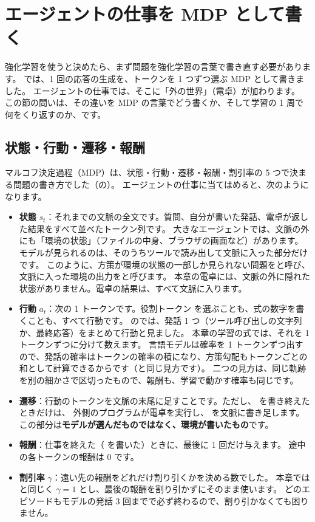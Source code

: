 \section{エージェントの仕事を MDP として書く}\label{sec:arl-mdp}

強化学習を使うと決めたら、まず問題を強化学習の言葉で書き直す必要があります。
では、1 回の応答の生成を、トークンを 1 つずつ選ぶ MDP として書きました。
エージェントの仕事では、そこに「外の世界」（電卓）が加わります。
この節の問いは、その違いを MDP の言葉でどう書くか、そして学習の 1 周で何をくり返すのか、です。

\subsection{状態・行動・遷移・報酬}

マルコフ決定過程（MDP）は、状態・行動・遷移・報酬・割引率の 5 つで決まる問題の書き方でした（の）。
エージェントの仕事に当てはめると、次のようになります。

\begin{itemize}
\item \textbf{状態} $s_t$：それまでの文脈の全文です。質問、自分が書いた発話、電卓が返した結果をすべて並べたトークン列です。
大きなエージェントでは、文脈の外にも「環境の状態」（ファイルの中身、ブラウザの画面など）があります。
モデルが見られるのは、そのうちツールで読み出して文脈に入った部分だけです。
このように、方策が環境の状態の一部しか見られない問題をと呼び、文脈に入った環境の出力をと呼びます。
本章の電卓には、文脈の外に隠れた状態がありません。電卓の結果は、すべて文脈に入ります。
\item \textbf{行動} $a_t$：次の 1 トークンです。役割トークン  を選ぶことも、式の数字を書くことも、すべて行動です。
のでは、発話 1 つ（ツール呼び出しの文字列か、最終応答）をまとめて行動と見ました。
本章の学習の式では、それを 1 トークンずつに分けて数えます。
言語モデルは確率を 1 トークンずつ出すので、発話の確率はトークンの確率の積になり、方策勾配もトークンごとの和として計算できるからです（と同じ見方です）。
二つの見方は、同じ軌跡を別の細かさで区切ったもので、報酬も、学習で動かす確率も同じです。
\item \textbf{遷移}：行動のトークンを文脈の末尾に足すことです。ただし、 を書き終えたときだけは、
外側のプログラムが電卓を実行し、 を文脈に書き足します。
この部分は\textbf{モデルが選んだものではなく、環境が書いたもの}です。
\item \textbf{報酬}：仕事を終えた（ を書いた）ときに、最後に 1 回だけ与えます。
途中の各トークンの報酬は 0 です。
\item \textbf{割引率} $\gamma$：遠い先の報酬をどれだけ割り引くかを決める数でした。
本章ではと同じく $\gamma=1$ とし、最後の報酬を割り引かずにそのまま使います。
どのエピソードもモデルの発話 3 回までで必ず終わるので、割り引かなくても困りません。
\end{itemize}

